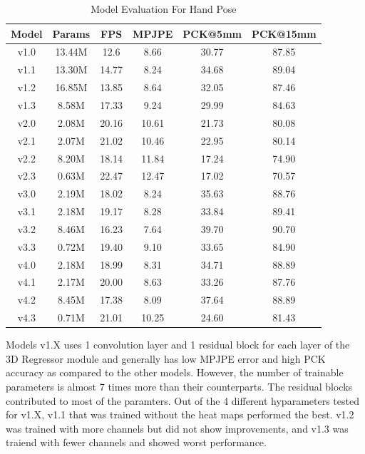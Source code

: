 \begin{table}[ht]
\centering
\begin{tabular*}{\textwidth}{c @{\extracolsep{\fill}} ccccc}
\hline
Model & Params & FPS & MPJPE & PCK@5mm & PCK@15mm \\
\hline
v1.0 & 13.44M & 12.6 & 8.66 & 30.77 & 87.85 \\ 
v1.1 & 13.30M & 14.77 & 8.24 & 34.68 & 89.04 \\
v1.2 & 16.85M & 13.85 & 8.64 & 32.05 & 87.46 \\
v1.3 & 8.58M & 17.33 & 9.24 & 29.99 & 84.63 \\
v2.0 & 2.08M & 20.16 & 10.61 & 21.73 & 80.08 \\ 
v2.1 & 2.07M & 21.02 & 10.46 & 22.95 & 80.14 \\
v2.2 & 8.20M & 18.14 & 11.84 & 17.24 & 74.90 \\
v2.3 & 0.63M & 22.47 & 12.47 & 17.02 & 70.57 \\
v3.0 & 2.19M & 18.02 & 8.24 & 35.63 & 88.76 \\ 
v3.1 & 2.18M & 19.17 & 8.28 & 33.84 & 89.41 \\
v3.2 & 8.46M & 16.23 & 7.64 & 39.70 & 90.70 \\
v3.3 & 0.72M & 19.40 & 9.10 & 33.65 & 84.90 \\
v4.0 & 2.18M & 18.99 & 8.31 & 34.71 & 88.89 \\ 
v4.1 & 2.17M & 20.00 & 8.63 & 33.26 & 87.76 \\
v4.2 & 8.45M & 17.38 & 8.09 & 37.64 & 88.89 \\
v4.3 & 0.71M & 21.01 & 10.25 & 24.60 & 81.43 \\
[1ex] 
\hline
\end{tabular*}

\caption{Model Evaluation For Hand Pose}
\label{table:model_evaluation_hand_pose}
\end{table}

\noindent
Models v1.X uses 1 convolution layer and 1 residual block for each layer of the 3D Regressor module and generally has low MPJPE error and high PCK accuracy as compared to the other models. However, the number of trainable parameters is almost 7 times more than their counterparts. The residual blocks contributed to most of the paramters. Out of the 4 different hyparameters tested for v1.X, v1.1 that was trained without the heat maps performed the best. v1.2 was trained with more channels but did not show improvements, and v1.3 was traiend with fewer channels and showed worst performance.

